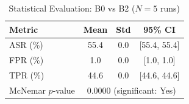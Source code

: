 \begin{table}[htbp]
\centering
\caption{Statistical Evaluation: B0 vs B2 ($N=5$ runs)}
\label{tab:statistical}
\begin{tabular}{lccc}
\toprule
\textbf{Metric} & \textbf{Mean} & \textbf{Std} & \textbf{95\% CI} \\
\midrule
  ASR (\%) & 55.4 & 0.0 & [55.4, 55.4] \\
  FPR (\%) & 1.0 & 0.0 & [1.0, 1.0] \\
  TPR (\%) & 44.6 & 0.0 & [44.6, 44.6] \\
\midrule
  McNemar $p$-value & \multicolumn{3}{c}{$0.0000$ (significant: Yes)} \\
\bottomrule
\end{tabular}
\end{table}
